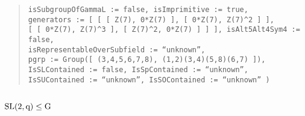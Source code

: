 \documentclass[a4paper,11pt]{article}
\theoremstyle{bla}
\begin{document}
\begin{quote}
  \hspace*{-1cm} \texttt{isSubgroupOfGammaL := false, isImprimitive := true,}\\
  \hspace*{-1cm} \texttt{generators := [ [ [ Z(7), 0*Z(7) ], [ 0*Z(7), Z(7)\^{}2 ] ],}\\
      \hspace*{-1cm} \texttt{[ [ 0*Z(7), Z(7)\^{}3 ], [ Z(7)\^{}2, 0*Z(7) ] ] ], isAlt5Alt4Sym4 := false,}\\
  \hspace*{-1cm} \texttt{isRepresentableOverSubfield := ``unknown'',}\\
  \hspace*{-1cm} \texttt{pgrp := Group([ (3,4,5,6,7,8), (1,2)(3,4)(5,8)(6,7) ]),}\\
  \hspace*{-1cm} \texttt{IsSLContained := false, IsSpContained := ``unknown'',}\\
  \hspace*{-1cm} \texttt{IsSUContained := ``unknown'', IsSOContained := ``unknown'' )}

\end{quote}


\subsection{$\rm{SL}(2,q) \leq G$}
\end{document}
